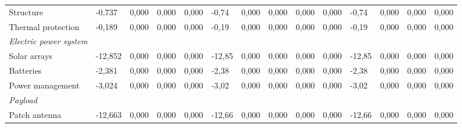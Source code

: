 \begin{landscape}
\begin{table}[]
{\begin{tabular}{| l | l | l | l | l | l | l | l | l | l | l | l | l | l |}
Structure                                                                              & -0,737           & 0,000           & 0,000           & 0,000           & -0,74           & 0,000           & 0,000           & 0,000           & 0,000           & -0,74           & 0,000            & 0,000            & 0,000            \\
Thermal protection                                                                     & -0,189           & 0,000           & 0,000           & 0,000           & -0,19           & 0,000           & 0,000           & 0,000           & 0,000           & -0,19           & 0,000            & 0,000            & 0,000            \\
\textit{Electric power system}                                                         &                  &                 &                 &                 &                 &                 &                 &                 &                 &                 &                  &                  &                  \\
Solar arrays                                                                           & -12,852          & 0,000           & 0,000           & 0,000           & -12,85          & 0,000           & 0,000           & 0,000           & 0,000           & -12,85          & 0,000            & 0,000            & 0,000            \\
Batteries                                                                              & -2,381           & 0,000           & 0,000           & 0,000           & -2,38           & 0,000           & 0,000           & 0,000           & 0,000           & -2,38           & 0,000            & 0,000            & 0,000            \\
Power management                                                                       & -3,024           & 0,000           & 0,000           & 0,000           & -3,02           & 0,000           & 0,000           & 0,000           & 0,000           & -3,02           & 0,000            & 0,000            & 0,000            \\
\textit{Payload}                                                                       &                  &                 &                 &                 &                 &                 &                 &                 &                 &                 &                  &                  &                  \\
Patch antenna                                                                          & -12,663          & 0,000           & 0,000           & 0,000           & -12,66          & 0,000           & 0,000           & 0,000           & 0,000           & -12,66          & 0,000            & 0,000            & 0,000            \\

\end{tabular}}
\end{table}
\end{landscape}
